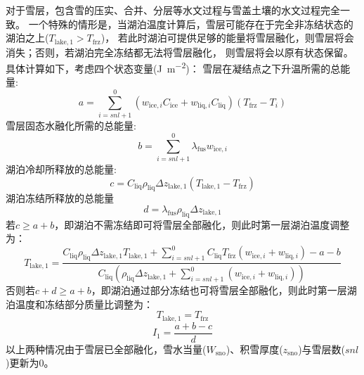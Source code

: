 对于雪层，包含雪的压实、合并、分层等水文过程与雪盖土壤的水文过程完全一致。
一个特殊的情形是，当湖泊温度计算后，雪层可能存在于完全非冻结状态的湖泊之上($T_{\mathrm{lake,1}}>T_{\mathrm {frz}} $)，
若此时湖泊可提供足够的能量将雪层融化，则雪层将会消失；否则，若湖泊完全冻结都无法将雪层融化，
则雪层将会以原有状态保留。具体计算如下，考虑四个状态变量(\unit{J.m^{-2}})：
雪层在凝结点之下升温所需的总能量:
\begin{equation}
  a=\sum_{i=s n l+1}^{0}\left(w_{\mathrm{ice},i} C_{\mathrm{ice}}+w_{\mathrm{liq},i} C_{\mathrm{liq}}\right)\left(T_{\mathrm {frz}}-T_{i}\right)
\end{equation}
雪层固态水融化所需的总能量:
\begin{equation}
  b=\sum_{i=s n l+1}^{0} \lambda_{\mathrm {fus}} w_{\mathrm{ice},i}
\end{equation}
湖泊冷却所释放的总能量:
\begin{equation}
  c=C_{\mathrm{liq}} \rho_{\mathrm{liq}} \Delta z_{\mathrm{lake, 1}}\left(T_{\mathrm{lake, 1}}-T_{\mathrm {frz}}\right)
\end{equation}
湖泊冻结所释放的总能量
\begin{equation}
  d=\lambda_{\mathrm {fus}} \rho_{\mathrm{liq}} \Delta z_{\mathrm{lake, 1}}
\end{equation}
若$c\geqslant a+b$，即湖泊不需冻结即可将雪层全部融化，则此时第一层湖泊温度调整为：
\begin{equation}
  T_{\mathrm{lake, 1}}=\frac{C_{\mathrm{liq}} \rho_{\mathrm{liq}} \Delta z_{\mathrm{lake, 1}} T_{\mathrm{lake, 1}}+\sum_{i=s n l+1}^{0} C_{\mathrm{liq}}
  T_{\mathrm {frz}}\left(w_{\mathrm{ice},i}+w_{\mathrm{liq},i}\right)-a-b}{C_{\mathrm{liq}}\left(\rho_{\mathrm{liq}} \Delta z_{\mathrm{lake, 1}}+\sum_{i=s n l+1}^{0}
  \left(w_{\mathrm{ice},i}+w_{\mathrm{liq},i}\right)\right)}
\end{equation}
否则若$c+d\geqslant a+b$，即湖泊通过部分冻结也可将雪层全部融化，则此时第一层湖泊温度和冻结部分质量比调整为：
\begin{equation}
  T_{\mathrm{lake, 1}}=T_{\mathrm {frz}}
\end{equation}
\begin{equation}
  I_{1}=\frac{a+b-c}{d}
\end{equation}
以上两种情况由于雪层已全部融化，雪水当量($W_{\mathrm{sno}}$)、积雪厚度($z_{\mathrm{sno}}$)与雪层数($snl$)更新为0。
